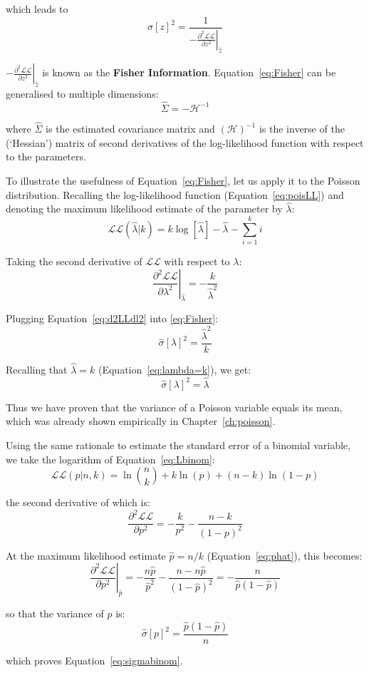 \noindent which leads to
\begin{equation}
  \hat{\sigma}[z]^2 =
  \frac{1}{-\left.\frac{\partial^2\mathcal{LL}}{\partial{z^2}}\right|_{\hat{z}}}
  \label{eq:Fisher}
\end{equation}

$-\left.\frac{\partial^2\mathcal{LL}}{\partial{z^2}}\right|_{\hat{z}}$ is known as the
\textbf{Fisher Information}. Equation~\ref{eq:Fisher} can be
generalised to multiple dimensions:
\begin{equation}
  \hat{\Sigma} = -\mathcal{H}^{-1}
  \label{eq:multidimFisher}
\end{equation}

\noindent where $\hat{\Sigma}$ is the estimated covariance matrix and
$(\mathcal{H})^{-1}$ is the inverse of the (`Hessian') matrix of
second derivatives of the log-likelihood function with respect to the
parameters.\medskip

To illustrate the usefulness of Equation~\ref{eq:Fisher}, let us apply
it to the Poisson distribution.  Recalling the log-likelihood function
(Equation~\ref{eq:poisLL}) and denoting the maximum likelihood
estimate of the parameter by $\hat{\lambda}$:
\[
\mathcal{LL}(\hat{\lambda}|k) =
k \log[\hat{\lambda}] - \hat{\lambda} - \sum\limits_{i=1}^{k}i
\]

Taking the second derivative of $\mathcal{LL}$ with respect to
$\lambda$:
\begin{equation}
  \left.\frac{\partial^2{\mathcal{LL}}}{\partial{\lambda^2}}\right|_{\hat{\lambda}}\! =
  -\frac{k}{\hat{\lambda}^2}
  \label{eq:d2LLdl2}
\end{equation}

Plugging Equation~\ref{eq:d2LLdl2} into \ref{eq:Fisher}:
\[
  \hat{\sigma}[\lambda]^2 = \frac{\hat{\lambda}^2}{k}
\]

Recalling that $\hat{\lambda} = k$ (Equation~\ref{eq:lambda=k}), we
get:
\begin{equation}
  \hat{\sigma}[\lambda]^2 = \hat{\lambda}
  \label{eq:poisvar}
\end{equation}

Thus we have proven that the variance of a Poisson variable equals its
mean, which was already shown empirically in
Chapter~\ref{ch:poisson}.\medskip

Using the same rationale to estimate the standard error of a binomial
variable, we take the logarithm of Equation~\ref{eq:Lbinom}:
\[
\mathcal{LL}(p|n,k) = \ln\!\binom{n}{k} + k \ln(p) + (n-k) \ln(1-p)
\]

\noindent the second derivative of which is:
\[
\frac{\partial^2\mathcal{LL}}{\partial{p^2}} =
-\frac{k}{p^2} - \frac{n-k}{(1-p)^2}
\]

At the maximum likelihood estimate $\hat{p}=n/k$
(Equation~\ref{eq:phat}), this becomes:
\[
\left.\frac{\partial^2\mathcal{LL}}{\partial{p^2}}\right|_{\hat{p}} =
-\frac{n\hat{p}}{\hat{p}^2} - \frac{n-n\hat{p}}{(1-\hat{p})^2} =
-\frac{n}{\hat{p}(1-\hat{p})}
\]

\noindent so that the variance of $p$ is:
\[
\hat{\sigma}[p]^2 = \frac{\hat{p}(1-\hat{p})}{n}
\]

\noindent which proves Equation~\ref{eq:sigmabinom}.
